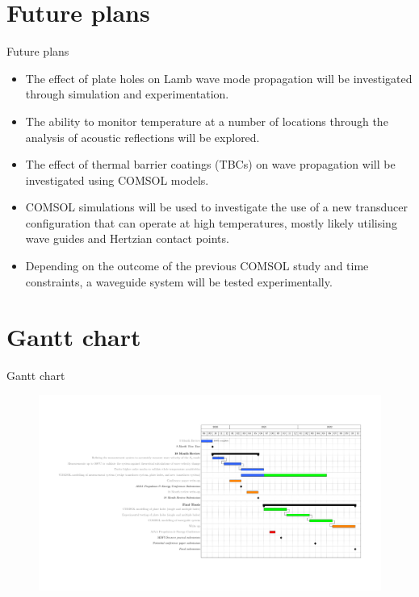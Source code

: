 \documentclass[aspectratio=169, 9pt]{beamer}
\begin{document}
\section{Future plans}
\begin{frame}{Future plans}
  \begin{itemize}
    \item The effect of plate holes on Lamb wave mode propagation will be investigated through simulation and experimentation.
    \item The ability to monitor temperature at a number of locations through the analysis of acoustic reflections will be explored.
    \item The effect of thermal barrier coatings (TBCs) on wave propagation will be investigated using COMSOL models.
    \item COMSOL simulations will be used to investigate the use of a new transducer configuration that can operate at high temperatures, mostly likely utilising wave guides and Hertzian contact points.
    \item Depending on the outcome of the previous COMSOL study and time constraints, a waveguide system will be tested experimentally.
\end{itemize}
\end{frame}

\section{Gantt chart}
\begin{frame}{Gantt chart}
  \begin{figure}
    \centering
    \includegraphics[width=\textwidth]{images/gantt.pdf}
  \end{figure}
\end{frame}


{\wavesbg%
\begin{frame}%
\end{frame}}
\end{document}
